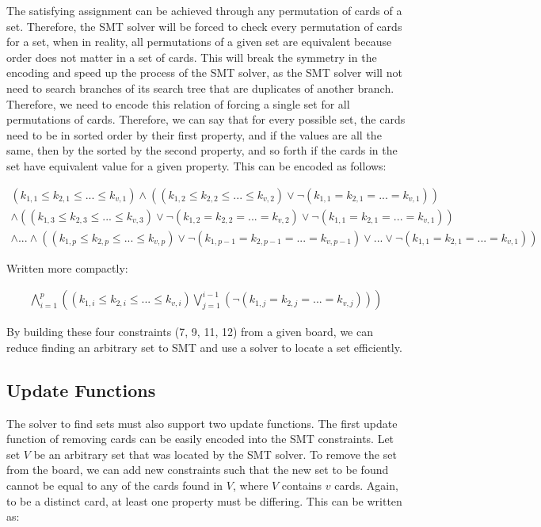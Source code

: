 \documentclass[pageno]{jpaper}
\begin{document}
The satisfying assignment can be achieved through any permutation of cards of a set. Therefore, the SMT solver will be forced to check every permutation of cards for a set, when in reality, all permutations of a given set are equivalent because order does not matter in a set of cards. This will break the symmetry in the encoding and speed up the process of the SMT solver, as the SMT solver will not need to search branches of its search tree that are duplicates of another branch. Therefore, we need to encode this relation of forcing a single set for all permutations of cards. Therefore, we can say that for every possible set, the cards need to be in sorted order by their first property, and if the values are all the same, then by the sorted by the second property, and so forth if the cards in the set have equivalent value for a given property. This can be encoded as follows: 

\begin{multline}
	(k_{1,1} \leq k_{2,1} \leq ... \leq k_{v,1}) \wedge (   (k_{1,2} \leq k_{2,2} \leq ... \leq k_{v,2})  \vee \neg (k_{1,1} = k_{2,1} = ... = k_{v,1})) \\
	\wedge (   (k_{1,3} \leq k_{2,3} \leq ... \leq k_{v,3})  \vee \neg (k_{1,2} = k_{2,2} = ... = k_{v,2}) \vee \neg (k_{1,1} = k_{2,1} = ... = k_{v,1})) \\
	\wedge ... \wedge (   (k_{1,p} \leq k_{2,p} \leq ... \leq k_{v,p})  \vee \neg (k_{1,p-1} = k_{2,p-1} = ... = k_{v,p-1}) \vee ... \vee \neg (k_{1,1} = k_{2,1} = ... = k_{v,1}))
\end{multline}

Written more compactly:

\begin{align}
	\bigwedge \limits_{i=1}^{p}   \left(  (k_{1,i} \leq k_{2,i} \leq ... \leq k_{v,i}) \bigvee \limits_{j=1}^{i-1}  \left( \neg (k_{1,j} = k_{2,j} = ... = k_{v,j})  \right)   \right)
\end{align}

By building these four constraints (7, 9, 11, 12) from a given board, we can reduce finding an arbitrary set to SMT and use a solver to locate a set efficiently. 


\subsection{Update Functions} 
The solver to find sets must also support two update functions. The first update function of removing cards can be easily encoded into the SMT constraints. Let set $V$ be an arbitrary set that was located by the SMT solver. To remove the set from the board, we can add new constraints such that the new set to be found cannot be equal to any of the cards found in $V$, where $V$ contains $v$ cards. Again, to be a distinct card, at least one property must be differing. This can be written as:
\end{document}
